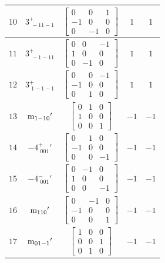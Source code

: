 \documentclass[fleqn,8pt]{jsarticle}
\begin{document}
\begin{longtable}{ccccc}
$ 10 $ & $ 3^{+}_{\,\,-11-1} $ & $ \begin{bmatrix} 0 & 0 & 1 \\ -1 & 0 & 0 \\ 0 & -1 & 0 \end{bmatrix} $ & $ 1 $ & $ 1 $ \\ \hline
$ 11 $ & $ 3^{+}_{\,\,-1-11} $ & $ \begin{bmatrix} 0 & 0 & -1 \\ 1 & 0 & 0 \\ 0 & -1 & 0 \end{bmatrix} $ & $ 1 $ & $ 1 $ \\ \hline
$ 12 $ & $ 3^{+}_{\,\,1-1-1} $ & $ \begin{bmatrix} 0 & 0 & -1 \\ -1 & 0 & 0 \\ 0 & 1 & 0 \end{bmatrix} $ & $ 1 $ & $ 1 $ \\ \hline
$ 13 $ & $ {\rm m}_{1-10}{}' $ & $ \begin{bmatrix} 0 & 1 & 0 \\ 1 & 0 & 0 \\ 0 & 0 & 1 \end{bmatrix} $ & $ -1 $ & $ -1 $ \\ \hline
$ 14 $ & $ -4^{+}_{\,\,001}{}' $ & $ \begin{bmatrix} 0 & 1 & 0 \\ -1 & 0 & 0 \\ 0 & 0 & -1 \end{bmatrix} $ & $ -1 $ & $ -1 $ \\ \hline
$ 15 $ & $ -4^{-}_{\,\,001}{}' $ & $ \begin{bmatrix} 0 & -1 & 0 \\ 1 & 0 & 0 \\ 0 & 0 & -1 \end{bmatrix} $ & $ -1 $ & $ -1 $ \\ \hline
$ 16 $ & $ {\rm m}_{110}{}' $ & $ \begin{bmatrix} 0 & -1 & 0 \\ -1 & 0 & 0 \\ 0 & 0 & 1 \end{bmatrix} $ & $ -1 $ & $ -1 $ \\ \hline
$ 17 $ & $ {\rm m}_{01-1}{}' $ & $ \begin{bmatrix} 1 & 0 & 0 \\ 0 & 0 & 1 \\ 0 & 1 & 0 \end{bmatrix} $ & $ -1 $ & $ -1 $ \\ \hline

\end{longtable}
\end{document}
